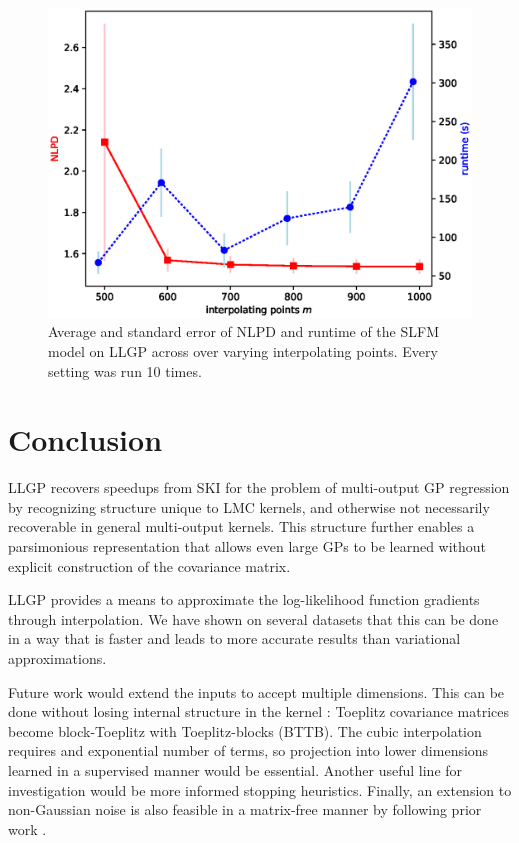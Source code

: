 \documentclass{article}
\begin{document}
\begin{figure}[!ht]
\vskip 0.2in
\begin{center}
\centerline{\includegraphics[width=\columnwidth]{m_time_nlpd.eps}}
\caption{Average and standard error of NLPD and runtime of the SLFM model on LLGP across over varying interpolating points. Every setting was run 10 times.}
\label{fig:llgpweather}
\end{center}
\vskip -0.2in
\end{figure}
\section{Conclusion}\label{conclusion}

LLGP recovers speedups from SKI \cite{kiss-gp} for the problem of multi-output GP regression by recognizing structure unique to LMC kernels, and otherwise not necessarily recoverable in general multi-output kernels. This structure further enables a parsimonious representation that allows even large GPs to be learned without explicit construction of the covariance matrix.

LLGP provides a means to approximate the log-likelihood function gradients through interpolation. We have shown on several datasets that this can be done in a way that is faster and leads to more accurate results than variational approximations.

Future work would extend the inputs to accept multiple dimensions. This can be done without losing internal structure in the kernel \cite{msgp}: Toeplitz covariance matrices become block-Toeplitz with Toeplitz-blocks (BTTB). The cubic interpolation requires and exponential number of terms, so projection into lower dimensions learned in a supervised manner would be essential. Another useful line for investigation would be more informed stopping heuristics. Finally, an extension to non-Gaussian noise is also feasible in a matrix-free manner by following prior work \cite{cutajar2016preconditioning}.


\end{document}
